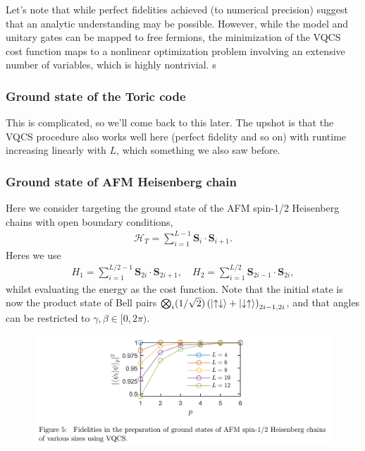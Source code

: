 \documentclass{book}
\theoremstyle{definition}
\newcommand{\had}{\mathcal{H}}
\newcommand{\lp}{\left(}
\newcommand{\rp}{\right)}
\begin{document}
Let's note that while perfect fidelities achieved (to numerical precision) suggest that an analytic understanding may be possible. However, while the model and unitary gates can be mapped to free fermions, the minimization of the VQCS cost function maps to a nonlinear optimization problem involving an extensive number of variables, which is highly nontrivial. s


















\subsubsection{Ground state of the Toric code}

This is complicated, so we'll come back to this later. The upshot is that the VQCS procedure also works well here (perfect fidelity and so on) with runtime increasing linearly with $L$, which something we also saw before. 

\subsubsection{Ground state of AFM Heisenberg chain}


Here we consider targeting the ground state of the AFM spin-1/2 Heisenberg chains with open boundary conditions,
\begin{align}
\had_T = \sum^{L-1}_{i=1}\bm{S}_i \cdot \bm{S}_{i+1}.
\end{align}
Heres we use
\begin{align}
H_1 = \sum^{L/2-1}_{i=1} \bm{S}_{2i} \cdot \bm{S}_{2i+1}, \quad H_2 = \sum^{L/2}_{i=1} \bm{S}_{2i-1} \cdot \bm{S}_{2i}, 
\end{align}
whilst evaluating the energy as the cost function. Note that the initial state is now the product state of Bell pairs $\bigotimes_i (1/\sqrt{2})\lp \ket{\uparrow\downarrow} + \ket{\downarrow\uparrow} \rp_{2i-1,2i}$, and that angles can be restricted to $\gamma,\beta \in [0,2\pi)$.
\begin{figure}[!htb]
	\centering
	\includegraphics[scale=0.3]{afm}
\end{figure}
\end{document}
